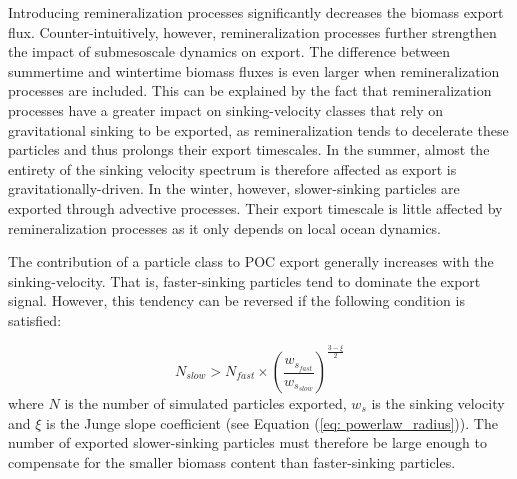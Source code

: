 \documentclass[draft,linenumbers]{agujournal2018}
\begin{document}
Introducing remineralization processes significantly decreases the biomass export flux. Counter-intuitively, however, remineralization processes further strengthen the impact of submesoscale dynamics on export. The difference between summertime and wintertime biomass fluxes is even larger when remineralization processes are included. This can be explained by the fact that remineralization processes have a greater impact on sinking-velocity classes that rely on gravitational sinking to be exported, as remineralization tends to decelerate these particles and thus prolongs their export timescales. In the summer, almost the entirety of the sinking velocity spectrum is therefore affected as export is gravitationally-driven. In the winter, however, slower-sinking particles are exported through advective processes. Their export timescale is little affected by remineralization processes as it only depends on local ocean dynamics.

The contribution of a particle class to POC export generally increases with the sinking-velocity. That is, faster-sinking particles tend to dominate the export signal. However, this tendency can be reversed if the following condition is satisfied:

\begin{equation}
    N_{slow} > N_{fast} \times \left(\frac{w_{s_{fast}}}{w_{s_{slow}}}\right)^{\frac{3 - \xi}{2}}
    \label{eq: condition}
\end{equation}
where $N$ is the number of simulated particles exported, $w_s$ is the sinking velocity and $\xi$ is the Junge slope coefficient (see Equation (\ref{eq: powerlaw_radius})). The number of exported slower-sinking particles must therefore be large enough to compensate for the smaller biomass content than faster-sinking particles. 
\end{document}
